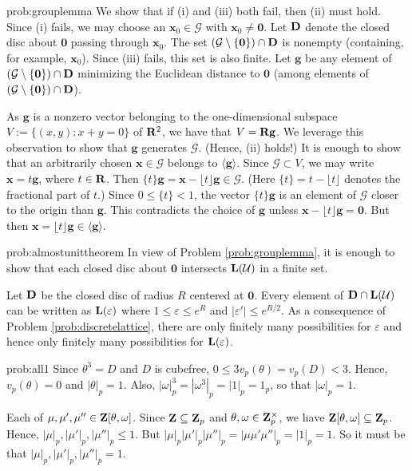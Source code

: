 \begin{sol}{prob:grouplemma} We show that if (i) and (iii) both fail, then (ii) must hold. Since (i) fails, we may choose an $\mathbf{x}_0 \in \mathcal{G}$ with $\mathbf{x}_0 \ne \mathbf{0}$. Let $\mathbf{D}$ denote the closed disc about $\mathbf{0}$ passing through $\mathbf{x}_0$. The set $(\mathcal{G}\setminus\{\mathbf{0}\}) \cap \mathbf{D}$ is nonempty (containing, for example, $\mathbf{x}_0$). Since (iii) fails, this set is also finite. Let $\mathbf{g}$ be any element of $(\mathcal{G}\setminus\{\mathbf{0}\}) \cap \mathbf{D}$ minimizing the Euclidean distance to $\mathbf{0}$ (among elements of $(\mathcal{G}\setminus\{\mathbf{0}\}) \cap \mathbf{D}$). 

As $\mathbf{g}$ is a nonzero vector belonging to the one-dimensional subspace $V:= \{(x,y): x+y=0\}$ of $\mathbf{R}^2$, we have that $V = \mathbf{R}\mathbf{g}$. We leverage this observation to show that $\mathbf{g}$ generates $\mathcal{G}$. (Hence, (ii) holds!) It is enough to show that an arbitrarily chosen $\mathbf{x} \in \mathcal{G}$ belongs to $\langle \mathbf{g}\rangle$. Since $\mathcal{G} \subset V$, we may write $\mathbf{x} = t\mathbf{g}$, where $t \in \mathbf{R}$. Then $\{t\} \mathbf{g} = \mathbf{x} - \lfloor t\rfloor \mathbf{g} \in \mathcal{G}$. (Here $\{t\} = t -\lfloor t\rfloor$ denotes the fractional part of $t$.) Since $0 \le \{t\} < 1$, the vector $\{t\}\mathbf{g}$ is an element of $\mathcal{G}$ closer to the origin than $\mathbf{g}$. This contradicts the choice of $\textbf{g}$ unless $\mathbf{x} -\lfloor t\rfloor\mathbf{g} =\mathbf{0}$. But then $\mathbf{x} = \lfloor t\rfloor \mathbf{g} \in \langle \mathbf{g}\rangle$. 
\end{sol}


\begin{sol}{prob:almostunittheorem} In view of Problem \ref{prob:grouplemma}, it is enough to show that each closed disc about $\mathbf{0}$ intersects $\mathbf{L}(\mathcal{U})$ in a finite set.

Let $\mathbf{D}$ be the closed disc of radius $R$ centered at $\mathbf{0}$. Every element of $\mathbf{D} \cap \mathbf{L}(\mathcal{U})$ can be written as $\mathbf{L}(\varepsilon)$ where $1 \le \varepsilon \le e^R$ and $|\varepsilon'| \le e^{R/2}$. As a consequence of Problem \ref{prob:discretelattice}, there are only finitely many possibilities for $\varepsilon$ and hence only finitely many possibilities for $\mathbf{L}(\varepsilon)$. 
\end{sol}

\begin{sol}{prob:all1} Since $\theta^3=D$ and $D$ is cubefree, $0 \le 3 v_p(\theta) = v_p(D) < 3$. Hence, $v_p(\theta)=0$ and $|\theta|_p=1$. Also, $|\omega|_p^3 = |\omega^3|_p = |1|_p = 1_p$, so that $|\omega|_p=1$.

Each of $\mu, \mu', \mu'' \in \mathbf{Z}[\theta, \omega]$. Since $\mathbf{Z}\subseteq \mathbf{Z}_p$ and $\theta, \omega \in \mathbf{Z}_p^{\times}$, we have $\mathbf{Z}[\theta,\omega] \subseteq \mathbf{Z}_p$. Hence, $|\mu|_p, |\mu'|_p, |\mu''|_p \le 1$. But $|\mu|_p |\mu'|_p |\mu''|_p = |\mu \mu' \mu''|_p = |1|_p=1$. So it must be that $|\mu|_p, |\mu'|_p, |\mu''|_p = 1$.
\end{sol}

